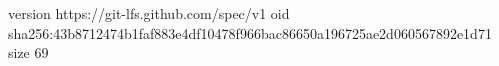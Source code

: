 version https://git-lfs.github.com/spec/v1
oid sha256:43b8712474b1faf883e4df10478f966bac86650a196725ae2d060567892e1d71
size 69
